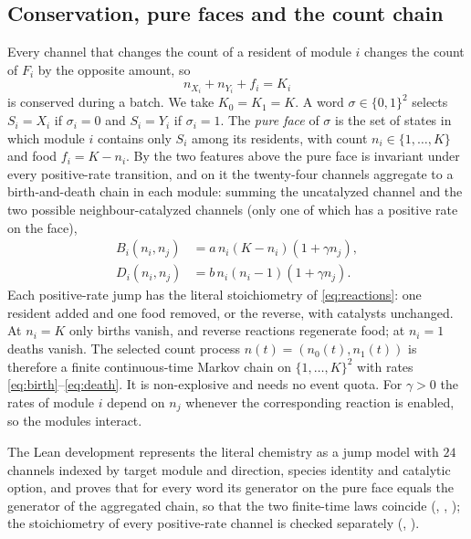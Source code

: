 \documentclass[11pt,a4paper]{article}
\theoremstyle{plain}
\theoremstyle{definition}
\theoremstyle{remark}
\begin{document}
\subsection{Conservation, pure faces and the count chain}
Every channel that changes the count of a resident of module $i$ changes the count of $F_i$ by the opposite amount, so
\begin{equation}\label{eq:conservation}
 n_{X_i}+n_{Y_i}+f_i=K_i
\end{equation}
is conserved during a batch. We take $K_0=K_1=K$. A word $\sigma\in\{0,1\}^2$ selects $S_i=X_i$ if $\sigma_i=0$ and $S_i=Y_i$ if $\sigma_i=1$. The \emph{pure face} of $\sigma$ is the set of states in which module $i$ contains only $S_i$ among its residents, with count $n_i\in\{1,\dots,K\}$ and food $f_i=K-n_i$. By the two features above the pure face is invariant under every positive-rate transition, and on it the twenty-four channels aggregate to a birth-and-death chain in each module: summing the uncatalyzed channel and the two possible neighbour-catalyzed channels (only one of which has a positive rate on the face),
\begin{align}
 B_i(n_i,n_j)&=a\,n_i(K-n_i)(1+\gamma n_j),\label{eq:birth}\\
 D_i(n_i,n_j)&=b\,n_i(n_i-1)(1+\gamma n_j).\label{eq:death}
\end{align}
Each positive-rate jump has the literal stoichiometry of \eqref{eq:reactions}: one resident added and one food removed, or the reverse, with catalysts unchanged. At $n_i=K$ only births vanish, and reverse reactions regenerate food; at $n_i=1$ deaths vanish. The selected count process $n(t)=(n_0(t),n_1(t))$ is therefore a finite continuous-time Markov chain on $\{1,\dots,K\}^2$ with rates \eqref{eq:birth}--\eqref{eq:death}. It is non-explosive and needs no event quota. For $\gamma>0$ the rates of module $i$ depend on $n_j$ whenever the corresponding reaction is enabled, so the modules interact.

The Lean development represents the literal chemistry as a jump model with $24$ channels indexed by target module and direction, species identity and catalytic option, and proves that for every word its generator on the pure face equals the generator of the aggregated chain, so that the two finite-time laws coincide (, , ); the stoichiometry of every positive-rate channel is checked separately (, ).
\end{document}
